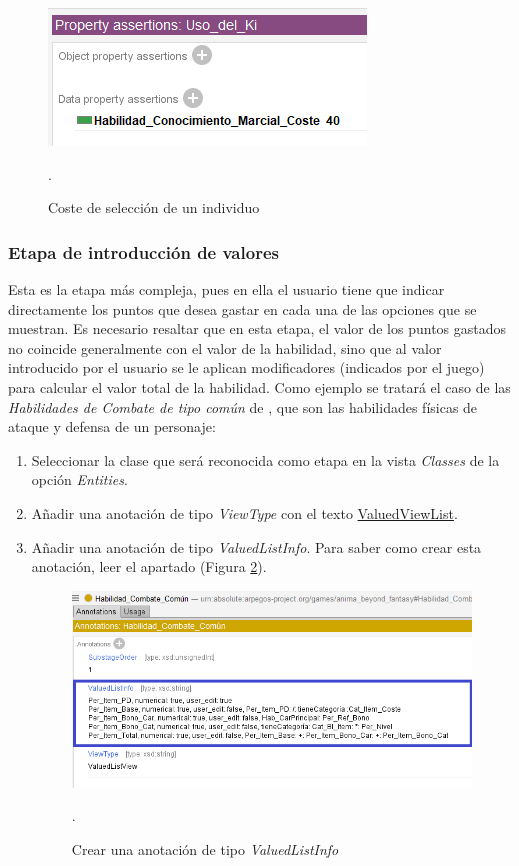 \begin{figure}[H]
    \centering
    \includegraphics[scale=0.6]{Figures/Protege/Coste_seleccion_individuo.png}
    \caption{Coste de selección de un individuo}.
    \label{Coste_seleccion_individuo}
\end{figure}

\subsubsection{Etapa de introducción de valores}
Esta es la etapa más compleja, pues en ella el usuario tiene que indicar directamente los puntos que desea gastar en cada una 
de las opciones que se muestran. Es necesario resaltar que en esta etapa, el valor de los puntos gastados no coincide generalmente 
con el valor de la habilidad, sino que al valor introducido por el usuario se le aplican modificadores (indicados por el juego) para 
calcular el valor total de la habilidad. Como ejemplo se tratará el caso de las \textit{Habilidades de Combate de tipo común} de \anima, 
que son las habilidades físicas de ataque y defensa de un personaje:

\begin{enumerate}
    \item Seleccionar la clase que será reconocida como etapa en la vista \textit{Classes} de la opción \textit{Entities}.
    \item Añadir una anotación de tipo \textit{ViewType} con el texto \underline{ValuedViewList}.
    \item Añadir una anotación de tipo \textit{ValuedListInfo}. Para saber como crear esta anotación, 
    leer el apartado  (Figura \ref*{ValuedListInfo_End}).
\newpage
    \begin{figure}[H]
        \centering
        \includegraphics[scale=0.6]{Figures/Protege/ValuedListInfo_End.png}
        \caption{Crear una anotación de tipo \textit{ValuedListInfo}}.
        \label{ValuedListInfo_End}
    \end{figure}
\end{enumerate}

